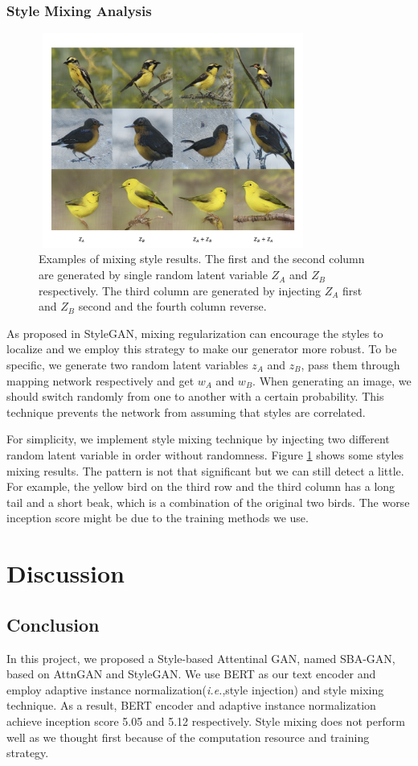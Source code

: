 \documentclass{article}
\begin{document}
\subsubsection{Style Mixing Analysis}
\begin{figure}
\centering
\includegraphics[width=250pt, height=200pt]{report/fig4.png} 
\caption{Examples of mixing style results. The first and the second column are generated by single random latent variable $Z_A$ and $Z_B$ respectively. The third column are generated by injecting $Z_A$ first and $Z_B$ second and the fourth column reverse.}
\label{fig4}
\end{figure}
As proposed in StyleGAN\cite{stylegan}, mixing regularization can encourage the styles to localize and we employ this strategy to make our generator more robust. To be specific, we generate two random latent variables $z_A$ and $z_B$, pass them through mapping network respectively and get $w_A$ and $w_B$. When generating an image, we should switch randomly from one to another with a certain probability. This technique prevents the network from assuming that styles are correlated.

For simplicity, we implement style mixing technique by injecting two different random latent variable in order without randomness. Figure \ref{fig4} shows some styles mixing results. The pattern is not that significant but we can still detect a little. For example, the yellow bird on the third row and the third column has a long tail and a short beak, which is a combination of the original two birds. The worse inception score might be due to the training methods we use.


\section{Discussion}
\subsection{Conclusion}
In this project, we proposed a Style-based Attentinal GAN, named SBA-GAN, based on AttnGAN\cite{attngan} and StyleGAN\cite{stylegan}. We use BERT as our text encoder and employ adaptive instance normalization(\textit{i.e.},style injection) and style mixing technique. As a result, BERT encoder and adaptive instance normalization achieve inception score 5.05 and 5.12 respectively. Style mixing does not perform well as we thought first because of the computation resource and training strategy.
\end{document}
